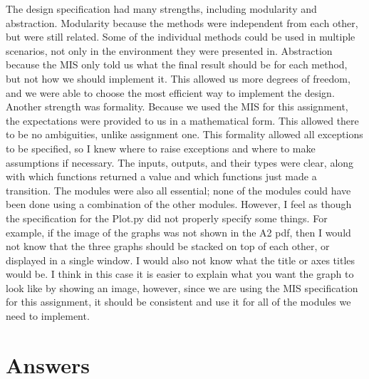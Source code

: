 \documentclass[12pt]{article}
\begin{document}
The design specification had many strengths, including modularity and abstraction. Modularity because the methods were independent from each other, but were still related. Some of the individual methods could be used in multiple scenarios, not only in the environment they were presented in. Abstraction because the MIS only told us what the final result should be for each method, but not how we should implement it. This allowed us more
degrees of freedom, and we were able to choose the most efficient way to implement the design. Another strength was formality. Because we used the MIS for this assignment, the expectations were provided to us in a mathematical form. This allowed there to be no ambiguities, unlike assignment one. This formality allowed all exceptions to be specified, so I knew where to raise exceptions and where to make assumptions if necessary. The inputs, outputs, and their types were clear, along with which functions returned a value and which functions just made a transition. The modules were also all essential; none of the modules could have been done using a combination of the other modules. However, I feel as though the specification for the Plot.py did not properly specify some things. For example, if the image of the graphs was not shown in the A2 pdf, then I would not know that the three graphs should be stacked on top of each other, or displayed in a single window. I would also not know what the title or axes titles would be. I think in this case it is easier to explain what you want the graph to look like by showing an image, however, since we are using the MIS specification for this assignment, it should be consistent and use it for all of the modules we need to implement.

\section{Answers}
\end{document}
